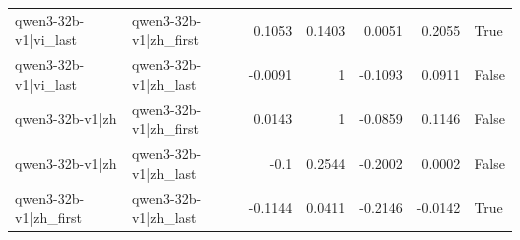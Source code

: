 \begin{table}
\begin{tabular}{l l r r r r l}
qwen3-32b-v1|vi_last & qwen3-32b-v1|zh_first & 0.1053 & 0.1403 & 0.0051 & 0.2055 & True \\
qwen3-32b-v1|vi_last & qwen3-32b-v1|zh_last & -0.0091 & 1 & -0.1093 & 0.0911 & False \\
qwen3-32b-v1|zh & qwen3-32b-v1|zh_first & 0.0143 & 1 & -0.0859 & 0.1146 & False \\
qwen3-32b-v1|zh & qwen3-32b-v1|zh_last & -0.1 & 0.2544 & -0.2002 & 0.0002 & False \\
qwen3-32b-v1|zh_first & qwen3-32b-v1|zh_last & -0.1144 & 0.0411 & -0.2146 & -0.0142 & True \\
\bottomrule
\end{tabular}
\end{table}
